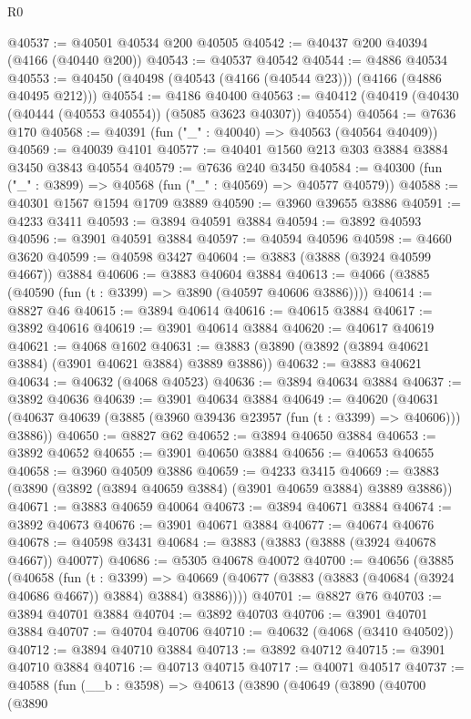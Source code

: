 \begin{lexlean}{R0}
\begin{coremodule}
@40537 := @40501 @40534 @200 @40505
@40542 := @40437 @200 @40394 (@4166 (@40440 @200))
@40543 := @40537 @40542
@40544 := @4886 @40534
@40553 := @40450 (@40498 (@40543 (@4166 (@40544 @23))) (@4166 (@4886 @40495 @212)))
@40554 := @4186 @40400
@40563 := @40412 (@40419 (@40430 (@40444 (@40553 @40554)) (@5085 @3623 @40307)) @40554)
@40564 := @7636 @170
@40568 := @40391 (fun ("_" : @40040) => @40563 (@40564 @40409))
@40569 := @40039 @4101
@40577 := @40401 @1560 @213 @303 @3884 @3884 @3450 @3843 @40554
@40579 := @7636 @240 @3450
@40584 := @40300 (fun ("_" : @3899) => @40568 (fun ("_" : @40569) => @40577 @40579))
@40588 := @40301 @1567 @1594 @1709 @3889
@40590 := @3960 @39655 @3886
@40591 := @4233 @3411
@40593 := @3894 @40591 @3884
@40594 := @3892 @40593
@40596 := @3901 @40591 @3884
@40597 := @40594 @40596
@40598 := @4660 @3620
@40599 := @40598 @3427
@40604 := @3883 (@3888 (@3924 @40599 @4667)) @3884
@40606 := @3883 @40604 @3884
@40613 := @4066 (@3885 (@40590 (fun (t : @3399) => @3890 (@40597 @40606 @3886))))
@40614 := @8827 @46
@40615 := @3894 @40614
@40616 := @40615 @3884
@40617 := @3892 @40616
@40619 := @3901 @40614 @3884
@40620 := @40617 @40619
@40621 := @4068 @1602
@40631 := @3883 (@3890 (@3892 (@3894 @40621 @3884) (@3901 @40621 @3884) @3889 @3886))
@40632 := @3883 @40621
@40634 := @40632 (@4068 @40523)
@40636 := @3894 @40634 @3884
@40637 := @3892 @40636
@40639 := @3901 @40634 @3884
@40649 := @40620
    (@40631 (@40637 @40639 (@3885 (@3960 @39436 @23957 (fun (t : @3399) => @40606))) @3886))
@40650 := @8827 @62
@40652 := @3894 @40650 @3884
@40653 := @3892 @40652
@40655 := @3901 @40650 @3884
@40656 := @40653 @40655
@40658 := @3960 @40509 @3886
@40659 := @4233 @3415
@40669 := @3883 (@3890 (@3892 (@3894 @40659 @3884) (@3901 @40659 @3884) @3889 @3886))
@40671 := @3883 @40659 @40064
@40673 := @3894 @40671 @3884
@40674 := @3892 @40673
@40676 := @3901 @40671 @3884
@40677 := @40674 @40676
@40678 := @40598 @3431
@40684 := @3883 (@3883 (@3888 (@3924 @40678 @4667)) @40077)
@40686 := @5305 @40678 @40072
@40700 := @40656
    (@3885
      (@40658
        (fun (t : @3399) =>
        @40669 (@40677 (@3883 (@3883 (@40684 (@3924 @40686 @4667)) @3884) @3884) @3886))))
@40701 := @8827 @76
@40703 := @3894 @40701 @3884
@40704 := @3892 @40703
@40706 := @3901 @40701 @3884
@40707 := @40704 @40706
@40710 := @40632 (@4068 (@3410 @40502))
@40712 := @3894 @40710 @3884
@40713 := @3892 @40712
@40715 := @3901 @40710 @3884
@40716 := @40713 @40715
@40717 := @40071 @40517
@40737 := @40588
    (fun (__b : @3598) =>
    @40613
      (@3890
        (@40649
          (@3890
            (@40700
              (@3890

\end{coremodule}
\end{lexlean}
